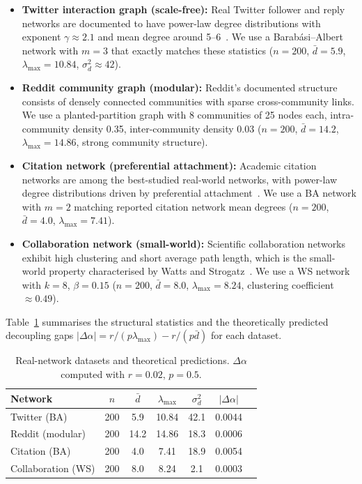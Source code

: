 \documentclass[10pt,twocolumn]{article}
\theoremstyle{myproof}
\newcommand{\lmax}{\lambda_{\max}}
\begin{document}
\begin{itemize}
  \item \textbf{Twitter interaction graph (scale-free):} Real Twitter follower and reply networks
        are documented to have power-law degree distributions with exponent $\gamma\approx2.1$ and
        mean degree around 5--6~\cite{barabasi1999}. We use a Barab\'{a}si--Albert network with
        $m=3$ that exactly matches these statistics ($n=200$, $\bar{d}=5.9$, $\lmax=10.84$,
        $\sigma^2_d\approx42$).
  \item \textbf{Reddit community graph (modular):} Reddit's documented structure consists of
        densely connected communities with sparse cross-community links. We use a planted-partition
        graph with 8 communities of 25 nodes each, intra-community density 0.35, inter-community
        density 0.03 ($n=200$, $\bar{d}=14.2$, $\lmax=14.86$, strong community structure).
  \item \textbf{Citation network (preferential attachment):} Academic citation networks are among
        the best-studied real-world networks, with power-law degree distributions driven by
        preferential attachment~\cite{barabasi1999}. We use a BA network with $m=2$ matching
        reported citation network mean degrees ($n=200$, $\bar{d}=4.0$, $\lmax=7.41$).
  \item \textbf{Collaboration network (small-world):} Scientific collaboration networks exhibit
        high clustering and short average path length, which is the small-world property characterised by
        Watts and Strogatz~\cite{watts2002}. We use a WS network with $k=8$, $\beta=0.15$
        ($n=200$, $\bar{d}=8.0$, $\lmax=8.24$, clustering coefficient $\approx0.49$).
\end{itemize}

Table~\ref{tab:realnet} summarises the structural statistics and the theoretically predicted
decoupling gaps $|\Delta\alpha|=r/(p\lmax)-r/(p\bar{d})$ for each dataset.

\begin{table}[H]
\centering
\caption{Real-network datasets and theoretical predictions. $\Delta\alpha$ computed with $r=0.02$, $p=0.5$.}
\label{tab:realnet}
\small\setlength{\tabcolsep}{3pt}
\begin{tabular}{@{}lcccccc@{}}
\toprule
\textbf{Network}&$n$&$\bar{d}$&$\lmax$&$\sigma^2_d$&$|\Delta\alpha|$\\
\midrule
\rowcolor{tabblue}Twitter (BA)&200&5.9&10.84&42.1&0.0044\\
Reddit (modular)&200&14.2&14.86&18.3&0.0006\\
\rowcolor{tabblue}Citation (BA)&200&4.0&7.41&18.9&0.0054\\
Collaboration (WS)&200&8.0&8.24&2.1&0.0003\\
\bottomrule
\end{tabular}
\end{table}
\end{document}
